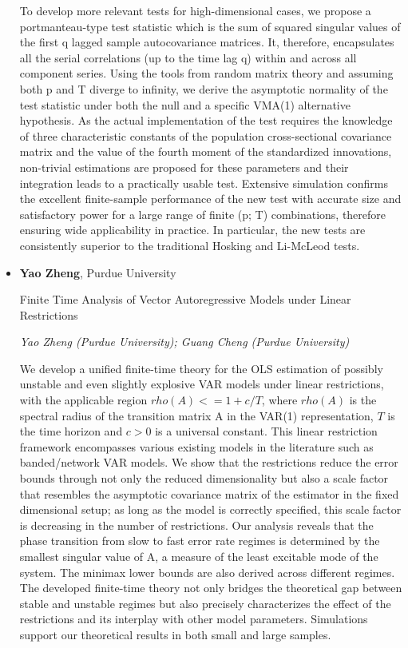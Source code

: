 \begin{itemize}
To develop more relevant tests for high-dimensional cases, we propose a portmanteau-type test statistic which is the sum of squared singular values of the first q lagged sample autocovariance matrices. It, therefore, encapsulates all the serial correlations (up to the time lag q) within and across all component series. Using the tools from random matrix theory and assuming both p and T diverge to infinity, we derive the asymptotic normality of the test statistic under both the null and a  specific VMA(1) alternative hypothesis. As the actual implementation of the test requires the knowledge of three characteristic constants of the population cross-sectional covariance matrix and the value of the fourth moment of the standardized innovations, non-trivial estimations are proposed for these parameters and their integration leads to a practically usable test. Extensive simulation confirms the excellent finite-sample performance of the new test with accurate size and satisfactory power for a large range of finite (p; T) combinations, therefore ensuring wide applicability in practice. In particular, the new tests are consistently superior to the traditional Hosking and Li-McLeod tests.

\item \textbf{Yao Zheng}, Purdue University

Finite Time Analysis of Vector Autoregressive Models under Linear Restrictions

\emph{\footnotesize Yao Zheng (Purdue University); Guang Cheng (Purdue University)}

We develop a unified finite-time theory for the OLS estimation of possibly unstable and even slightly explosive VAR models under linear restrictions, with the applicable region $rho(A) <= 1+c/T$, where $rho(A)$ is the spectral radius of the transition matrix A in the VAR(1) representation, $T$ is the time horizon and $c>0$ is a universal constant. This linear restriction framework encompasses various existing models in the literature such as banded/network VAR models. We show that the restrictions reduce the error bounds through not only the reduced dimensionality but also a scale factor that resembles the asymptotic covariance matrix of the estimator in the fixed dimensional setup; as long as the model is correctly specified, this scale factor is decreasing in the number of restrictions. Our analysis reveals that the phase transition from slow to fast error rate regimes is determined by the smallest singular value of A, a measure of the least excitable mode of the system. The minimax lower bounds are also derived across different regimes. The developed finite-time theory not only bridges the theoretical gap between stable and unstable regimes but also precisely characterizes the effect of the restrictions and its interplay with other model parameters. Simulations support our theoretical results in both small and large samples.

\end{itemize}

